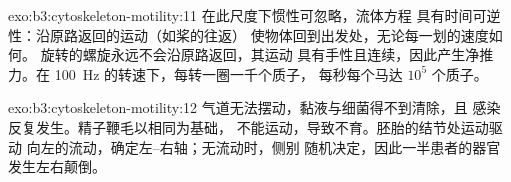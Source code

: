 \begin{solution}{exo:b3:cytoskeleton-motility:11}
在此尺度下惯性可忽略，流体方程
具有时间可逆性：沿原路返回的运动（如桨的往返）
使物体回到出发处，无论每一划的速度如何。
旋转的螺旋永远不会沿原路返回，其运动
具有手性且连续，因此产生净推力。在 \qty{100}{Hz}
的转速下，每转一圈一千个质子，
每秒每个马达 $10^{5}$ 个质子。
\end{solution}

\begin{solution}{exo:b3:cytoskeleton-motility:12}
气道无法摆动，黏液与细菌得不到清除，且
感染反复发生。精子鞭毛以相同为基础，
不能运动，导致不育。胚胎的结节处运动驱动
向左的流动，确定左–右轴；无流动时，侧别
随机决定，因此一半患者的器官发生左右颠倒。
\end{solution}

